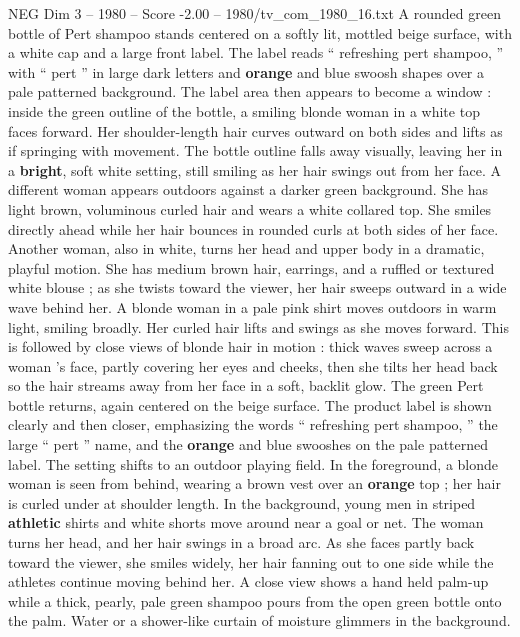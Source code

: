 \begin{textsample}{NEG Dim 3 – 1980 – Score -2.00 – 1980/tv\_com\_1980\_16.txt}  \label{ex:f3_neg_054}
A rounded green bottle of Pert shampoo stands centered on a softly lit, mottled beige surface, with a white cap and a large front label.
The label reads “ refreshing pert shampoo, ” with “ pert ” in large dark letters and \textbf{orange} and blue swoosh shapes over a pale patterned background.
The label area then appears to become a window : inside the green outline of the bottle, a smiling blonde woman in a white top faces forward.
Her shoulder-length hair curves outward on both sides and lifts as if springing with movement.
The bottle outline falls away visually, leaving her in a \textbf{bright}, soft white setting, still smiling as her hair swings out from her face.
A different woman appears outdoors against a darker green background.
She has light brown, voluminous curled hair and wears a white collared top.
She smiles directly ahead while her hair bounces in rounded curls at both sides of her face.
Another woman, also in white, turns her head and upper body in a dramatic, playful motion.
She has medium brown hair, earrings, and a ruffled or textured white blouse ; as she twists toward the viewer, her hair sweeps outward in a wide wave behind her.
A blonde woman in a pale pink shirt moves outdoors in warm light, smiling broadly.
Her curled hair lifts and swings as she moves forward.
This is followed by close views of blonde hair in motion : thick waves sweep across a woman ’s face, partly covering her eyes and cheeks, then she tilts her head back so the hair streams away from her face in a soft, backlit glow.
The green Pert bottle returns, again centered on the beige surface.
The product label is shown clearly and then closer, emphasizing the words “ refreshing pert shampoo, ” the large “ pert ” name, and the \textbf{orange} and blue swooshes on the pale patterned label.
The setting shifts to an outdoor playing field.
In the foreground, a blonde woman is seen from behind, wearing a brown vest over an \textbf{orange} top ; her hair is curled under at shoulder length.
In the background, young men in striped \textbf{athletic} shirts and white shorts move around near a goal or net.
The woman turns her head, and her hair swings in a broad arc.
As she faces partly back toward the viewer, she smiles widely, her hair fanning out to one side while the athletes continue moving behind her.
A close view shows a hand held palm-up while a thick, pearly, pale green shampoo pours from the open green bottle onto the palm.
Water or a shower-like curtain of moisture glimmers in the background.

\end{textsample}

